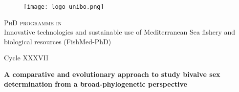 
{
    \textwidth=450pt

    \begin{titlepage}

    \begin{center}

    \begin{figure}[h]
        \centering
        \texttt{[image: logo\_unibo.png]}
        \label{fig:logo}
    \end{figure}

    {{\large{\textsc{PhD programme in}} \\
    Innovative technologies and sustainable use of Mediterranean Sea fishery and biological resources (FishMed-PhD)}} 
    \vspace{5mm}

    {\large{Cycle XXXVII}}
    \vspace{5mm}
    \end{center}

    {}

    \vspace{15mm}

    \begin{center} {

        {\LARGE{\bf A comparative and evolutionary approach to study bivalve sex determination from a broad-phylogenetic perspective}}\\




    }\end{center}

    \vspace{15mm} \par \noindent


\end{titlepage}}
